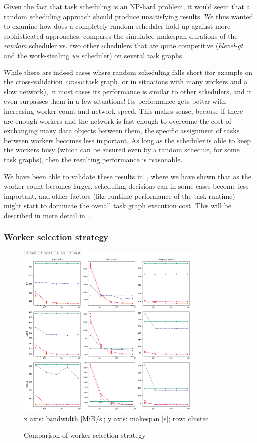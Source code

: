 Given the fact that task scheduling is an NP-hard problem, it would seem that a random scheduling
approach should produce unsatisfying results. We thus wanted to examine how does a completely
random scheduler hold up against more sophisticated approaches.  compares
the simulated makespan durations of the \emph{random} scheduler vs. two other schedulers
that are quite competitive (\emph{blevel-gt} and the work-stealing \emph{ws}
scheduler) on several task graphs.

While there are indeed cases where random scheduling falls short (for example on the
cross-validation \emph{crossv} task graph, or in situations with many workers and a slow
network), in most cases its performance is similar to other schedulers, and it even surpasses them
in a few situations! Its performance gets better with increasing worker count and network speed.
This makes sense, because if there are enough workers and the network is fast enough to overcome
the cost of exchanging many data objects between them, the specific assignment of tasks between
workers becomes less important. As long as the scheduler is able to keep the workers busy (which
can be ensured even by a random schedule, for some task graphs), then the resulting performance is
reasonable.

We have been able to validate these results in~\cite{rsds}, where we have shown that as
the worker count becomes larger, scheduling decisions can in some cases become less important, and
other factors (like runtime performance of the task runtime) might start to dominate the overall
task graph execution cost. This will be described in more detail in~.

\subsubsection*{Worker selection strategy}

\begin{figure}
	\centering
	\includegraphics[width=0.8\textwidth]{imgs/estee/charts/gt-scheduler}\\
	{\small x axis: bandwidth [MiB/s]; y axis: makespan [s]; row: cluster}
	\caption{Comparison of worker selection strategy}
	\label{fig:estee-chart-gt-scheduler}
\end{figure}

